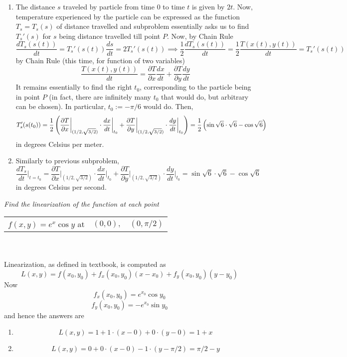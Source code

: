 \documentclass[8pt]{article} %
\begin{document}
\begin{description}
{\begin{enumerate}[\bfseries(a)]
			\item The distance $s$ traveled by particle from time $0$ to time $t$ is given by $2t$. Now, temperature experienced by
				the particle can be expressed as the function $T_s=T_s(s)$ of distance travelled and subproblem
				essentially asks us to find $T_s'(s)$ for $s$ being distance travelled till point $P$. Now, by Chain Rule
				\[\frac{dT_s(s(t))}{dt}=T_s'(s(t))\frac{ds}{dt}=2T_s'(s(t))\implies \frac{1}{2}\frac{dT_s(s(t))}{dt}=\frac{1}{2}
				\frac{T(x(t),y(t))}{dt}=T_s'(s(t))\]
				by Chain Rule (this time, for function of two variables)
				\[\frac{T(x(t),y(t))}{dt}=\frac{\partial T}{\partial x}\frac{dx}{dt}+\frac{\partial T}{\partial y}\frac{dy}{dt}\]
				It remains essentially to find the right $t_0$, corresponding to the particle being in point $P$ (in fact, there
				are infinitely many $t_0$ that would do, but arbitrary can be chosen). In particular, $t_0:=-\pi/6$ would do.
				Then, \[T_s'(s(t_0))=\frac{1}{2}\left(
				\frac{\partial T}{\partial x}\bigg|_{(1/2,\sqrt{3/2})}\cdot\frac{dx}{dt}\bigg|_{t_0}+
				\frac{\partial T}{\partial y}\bigg|_{(1/2,\sqrt{3/2})}\cdot\frac{dy}{dt}\bigg|_{t_0}\right)=
				\frac{1}{2}\left(\sin\sqrt{6}\cdot\sqrt{6}-\cos\sqrt{6}\right)\]in degrees Celsius per meter.
			\item Similarly to previous subproblem, 
				\[\frac{dT_s}{dt}\bigg|_{t=t_0}=
				\frac{\partial T}{\partial x}\bigg|_{(1/2,\sqrt{3/2})}\cdot\frac{dx}{dt}\bigg|_{t_0}+
				\frac{\partial T}{\partial y}\bigg|_{(1/2,\sqrt{3/2})}\cdot\frac{dy}{dt}\bigg|_{t_0}=
				{\sin\sqrt{6}\cdot\sqrt{6}-\cos\sqrt{6}}\]in degrees Celsius per second.
		\end{enumerate}
		}
	\item[\# 29.]{{\it Find the linearization of the function at each point}\\
	\begin{inparaenum}[\bfseries a.]\begin{tabular}{lll}
		$f(x,y)=e^x\cos y$ at &\item $(0,0),$ &\item $(0,\pi/2)$
	\end{tabular}\end{inparaenum}\\\\
		Linearization, as defined in textbook, is computed as
		\[L(x,y)=f(x_0,y_0)+f_x(x_0,y_0)(x-x_0)+f_y(x_0,y_0)(y-y_0)\]
		Now \[f_x(x_0,y_0)=e^{x_0}\cos y_0\] \[f_y(x_0,y_0)=-e^{x_0}\sin y_0\]
		and hence the answers are
		\begin{enumerate}[\bfseries a.]
			\item \[L(x,y)=1+1\cdot(x-0)+0\cdot(y-0)=1+x\]
			\item \[L(x,y)=0+0\cdot(x-0)-1\cdot(y-\pi/2)=\pi/2-y\]
		\end{enumerate}
		}
\end{description}
\end{document}
